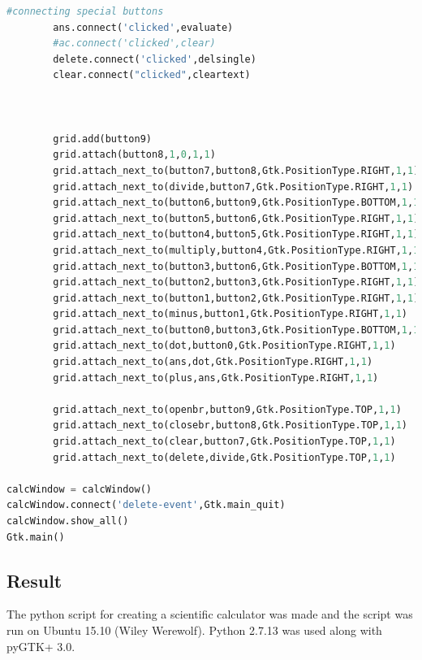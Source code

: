 \documentclass{article}
\begin{document}
\begin{lstlisting}[language=python]
		#connecting special buttons
		ans.connect('clicked',evaluate)
		#ac.connect('clicked',clear)
		delete.connect('clicked',delsingle)
		clear.connect("clicked",cleartext)



		grid.add(button9)
		grid.attach(button8,1,0,1,1)
		grid.attach_next_to(button7,button8,Gtk.PositionType.RIGHT,1,1)
		grid.attach_next_to(divide,button7,Gtk.PositionType.RIGHT,1,1)
		grid.attach_next_to(button6,button9,Gtk.PositionType.BOTTOM,1,1)
		grid.attach_next_to(button5,button6,Gtk.PositionType.RIGHT,1,1)
		grid.attach_next_to(button4,button5,Gtk.PositionType.RIGHT,1,1)
		grid.attach_next_to(multiply,button4,Gtk.PositionType.RIGHT,1,1)
		grid.attach_next_to(button3,button6,Gtk.PositionType.BOTTOM,1,1)
		grid.attach_next_to(button2,button3,Gtk.PositionType.RIGHT,1,1)
		grid.attach_next_to(button1,button2,Gtk.PositionType.RIGHT,1,1)
		grid.attach_next_to(minus,button1,Gtk.PositionType.RIGHT,1,1)
		grid.attach_next_to(button0,button3,Gtk.PositionType.BOTTOM,1,1)
		grid.attach_next_to(dot,button0,Gtk.PositionType.RIGHT,1,1)
		grid.attach_next_to(ans,dot,Gtk.PositionType.RIGHT,1,1)
		grid.attach_next_to(plus,ans,Gtk.PositionType.RIGHT,1,1)

		grid.attach_next_to(openbr,button9,Gtk.PositionType.TOP,1,1)
		grid.attach_next_to(closebr,button8,Gtk.PositionType.TOP,1,1)
		grid.attach_next_to(clear,button7,Gtk.PositionType.TOP,1,1)
		grid.attach_next_to(delete,divide,Gtk.PositionType.TOP,1,1)

calcWindow = calcWindow()
calcWindow.connect('delete-event',Gtk.main_quit)
calcWindow.show_all()
Gtk.main()			
\end{lstlisting}

\subsection{Result}
The python script for creating a scientific calculator was made and the script was run on Ubuntu 15.10 (Wiley Werewolf). Python 2.7.13 was used along with pyGTK+ 3.0.

\begin{refsection}
\cite{pyGTK}
\printbibliography
\end{refsection} 
 
\end{document}
